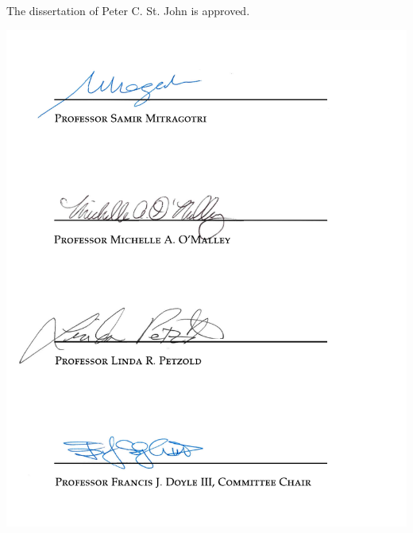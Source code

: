 \thispagestyle{empty}
The dissertation of Peter C. St. John is approved.
\vfil

\begin{center}
\includegraphics{preamble/signatures.pdf}
\end{center}

